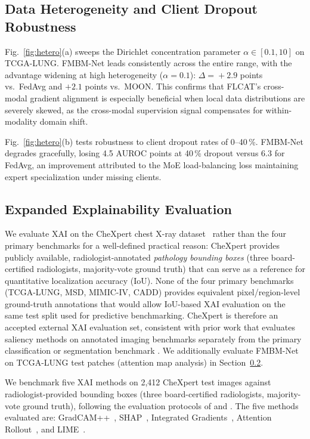 \documentclass[a4paper,fleqn]{cas-dc}
\begin{document}
\subsection{Data Heterogeneity and Client Dropout Robustness}

Fig.~\ref{fig:hetero}(a) sweeps the Dirichlet concentration parameter
$\alpha\!\in\![0.1,10]$ on TCGA-LUNG. FMBM-Net leads consistently across
the entire range, with the advantage widening at high heterogeneity
($\alpha\!=\!0.1$): $\Delta\!=\!+2.9$ points vs.\ FedAvg and
$+2.1$ points vs.\ MOON. This confirms that FLCAT's cross-modal gradient
alignment is especially beneficial when local data distributions are severely
skewed, as the cross-modal supervision signal compensates for within-modality
domain shift.

Fig.~\ref{fig:hetero}(b) tests robustness to client dropout rates of
0--40\,\%. FMBM-Net degrades gracefully, losing 4.5 AUROC points at 40\,\%
dropout versus 6.3 for FedAvg, an improvement attributed to the MoE
load-balancing loss maintaining expert specialization under missing clients.

\subsection{Expanded Explainability Evaluation}
\label{subsec:xai_expanded}

We evaluate XAI on the CheXpert chest X-ray dataset~\citep{irvin2019chexpert}
rather than the four primary benchmarks for a well-defined practical reason:
CheXpert provides publicly available, radiologist-annotated \emph{pathology
bounding boxes} (three board-certified radiologists, majority-vote ground truth)
that can serve as a reference for quantitative localization accuracy (IoU).
None of the four primary benchmarks (TCGA-LUNG, MSD, MIMIC-IV, CADD) provides
equivalent pixel/region-level ground-truth annotations that would allow IoU-based
XAI evaluation on the same test split used for predictive benchmarking.
CheXpert is therefore an accepted external XAI evaluation set, consistent with
prior work that evaluates saliency methods on annotated imaging benchmarks
separately from the primary classification or segmentation benchmark
\citep{bhatt2020evaluating,chattopadhay2018gradcampp}. We additionally evaluate
FMBM-Net on TCGA-LUNG test patches (attention map analysis) in
Section~\ref{subsec:xai_expanded}.

We benchmark five XAI methods on 2,412 CheXpert test images against
radiologist-provided bounding boxes (three board-certified radiologists,
majority-vote ground truth), following the evaluation protocols of
\citet{bhatt2020evaluating} and \citet{samek2021explaining}.
The five methods evaluated are:
GradCAM++~\citep{chattopadhay2018gradcampp},
SHAP~\citep{lundberg2017shap},
Integrated Gradients~\citep{sundararajan2017ig},
Attention Rollout~\citep{abnar2020rollout},
and LIME~\citep{ribeiro2016lime}.
\end{document}
